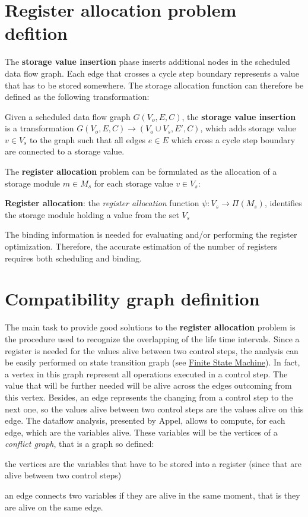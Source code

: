 \hypertarget{src_HLS_registerAllocation_page_register_definition}{}\section{Register allocation problem defition}\label{src_HLS_registerAllocation_page_register_definition}
The {\bfseries storage value insertion} phase inserts additional nodes in the scheduled data flow graph. Each edge that crosses a cycle step boundary represents a value that has to be stored somewhere. The storage allocation function can therefore be defined as the following transformation\+:

Given a scheduled data flow graph $G(V_o,E,C)$, the {\bfseries storage value insertion} is a transformation $G(V_o,E,C)\rightarrow (V_o\cup V_s,E',C)$, which adds storage value $v\in V_s$ to the graph such that all edges $e\in E$ which cross a cycle step boundary are connected to a storage value.

The {\bfseries register allocation} problem can be formulated as the allocation of a storage module $m\in M_s$ for each storage value $v\in V_s$\+:

{\bfseries Register allocation}\+: the {\itshape register allocation} function $\psi : V_s\rightarrow \Pi(M_s)$, identifies the storage module holding a value from the set $V_s$

The binding information is needed for evaluating and/or performing the register optimization. Therefore, the accurate estimation of the number of registers requires both scheduling and binding.\hypertarget{src_HLS_registerAllocation_page_compatibility_graph}{}\section{Compatibility graph definition}\label{src_HLS_registerAllocation_page_compatibility_graph}
The main task to provide good solutions to the {\bfseries register allocation} problem is the procedure used to recognize the overlapping of the life time intervals. Since a register is needed for the values alive between two control steps, the analysis can be easily performed on state transition graph (see \hyperlink{src_HLS_controller_stg}{Finite State Machine}). In fact, a vertex in this graph represent all operations executed in a control step. The value that will be further needed will be alive across the edges outcoming from this vertex. Besides, an edge represents the changing from a control step to the next one, so the values alive between two control steps are the values alive on this edge. The dataflow analysis, presented by Appel, allows to compute, for each edge, which are the variables alive. These variables will be the vertices of a {\itshape conflict graph}, that is a graph so defined\+:
\begin{DoxyItemize}
\item the vertices are the variables that have to be stored into a register (since that are alive between two control steps)
\item an edge connects two variables if they are alive in the same moment, that is they are alive on the same edge.
\end{DoxyItemize}

